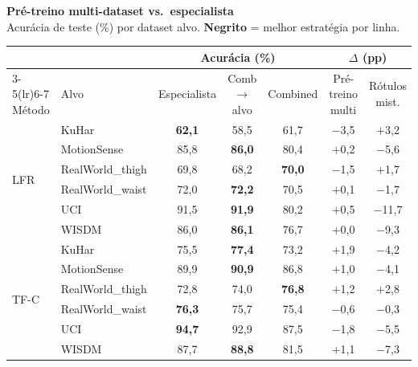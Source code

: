 \documentclass[border=8pt,varwidth=\maxdimen]{standalone}
\begin{document}
\centering
{\large\bfseries Pré-treino multi-dataset vs.\ especialista}\\[2pt]
{\small Acurácia de teste (\%) por dataset alvo. \textbf{Negrito} = melhor estratégia por linha.}\\[6pt]
\begin{tabular}{llccccc}
\toprule
& & \multicolumn{3}{c}{Acurácia (\%)} & \multicolumn{2}{c}{$\Delta$ (pp)}\\
\cmidrule(lr){3-5}\cmidrule(lr){6-7}
Método & Alvo & Especialista & Comb$\to$alvo & Combined & Pré-treino multi & Rótulos mist.\\
\midrule
\multirow{6}{*}{LFR}
 & KuHar            & \textbf{62{,}1} & 58{,}5 & 61{,}7 & $-$3{,}5 & $+$3{,}2\\
 & MotionSense      & 85{,}8 & \textbf{86{,}0} & 80{,}4 & $+$0{,}2 & $-$5{,}6\\
 & RealWorld\_thigh & 69{,}8 & 68{,}2 & \textbf{70{,}0} & $-$1{,}5 & $+$1{,}7\\
 & RealWorld\_waist & 72{,}0 & \textbf{72{,}2} & 70{,}5 & $+$0{,}1 & $-$1{,}7\\
 & UCI              & 91{,}5 & \textbf{91{,}9} & 80{,}2 & $+$0{,}5 & $-$11{,}7\\
 & WISDM            & 86{,}0 & \textbf{86{,}1} & 76{,}7 & $+$0{,}0 & $-$9{,}3\\
\midrule
\multirow{6}{*}{TF-C}
 & KuHar            & 75{,}5 & \textbf{77{,}4} & 73{,}2 & $+$1{,}9 & $-$4{,}2\\
 & MotionSense      & 89{,}9 & \textbf{90{,}9} & 86{,}8 & $+$1{,}0 & $-$4{,}1\\
 & RealWorld\_thigh & 72{,}8 & 74{,}0 & \textbf{76{,}8} & $+$1{,}2 & $+$2{,}8\\
 & RealWorld\_waist & \textbf{76{,}3} & 75{,}7 & 75{,}4 & $-$0{,}6 & $-$0{,}3\\
 & UCI              & \textbf{94{,}7} & 92{,}9 & 87{,}5 & $-$1{,}8 & $-$5{,}5\\
 & WISDM            & 87{,}7 & \textbf{88{,}8} & 81{,}5 & $+$1{,}1 & $-$7{,}3\\
\bottomrule
\end{tabular}
\end{document}
